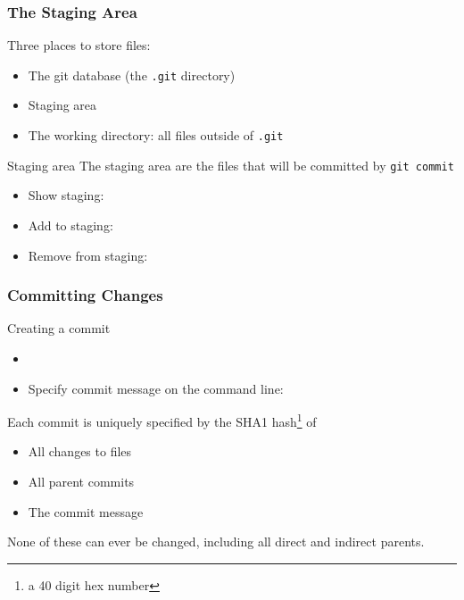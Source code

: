 \begin{frame}
  \frametitle{The Staging Area}

  Three places to store files:
  \begin{itemize}
  \item The git database (the \texttt{.git} directory)
  \item Staging area
  \item The working directory: all files outside of \texttt{.git} 
  \end{itemize}

  \begin{block}{Staging area}
    The staging area are the files that will be committed by
    \texttt{git commit}
    \begin{itemize}
    \item Show staging: 
    \item Add to staging: 
    \item Remove from staging: 
    \end{itemize}
  \end{block}
\end{frame}




\begin{frame}
  \frametitle{Committing Changes}

  \begin{block}{Creating a commit}
    \begin{itemize}
    \item 
    \item Specify commit message on the command line:\\
    \end{itemize}
  \end{block}
  
  Each commit is uniquely specified by the SHA1 hash\footnote{a 40
    digit hex number} of
  \begin{itemize}
  \item All changes to files
  \item All parent commits
  \item The commit message
  \end{itemize}
  None of these can ever be changed, including all direct and indirect
  parents.
\end{frame}


